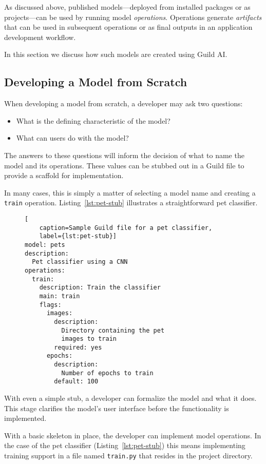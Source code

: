 \documentclass{article}
\begin{document}
As discussed above, published models---deployed from installed
packages or as projects---can be used by running model
\emph{operations}. Operations generate \emph{artifacts} that can be
used in subsequent operations or as final outputs in an application
development workflow.

In this section we discuss how such models are created using Guild AI.

\subsection{Developing a Model from Scratch}

When developing a model from scratch, a developer may ask two
questions:

\begin{itemize}
\item What is the defining characteristic of the model?
\item What can users do with the model?
\end{itemize}

The answers to these questions will inform the decision of what to
name the model and its operations. These values can be stubbed out in
a Guild file to provide a scaffold for implementation.

In many cases, this is simply a matter of selecting a model name and
creating a \verb|train| operation. Listing~\ref{lst:pet-stub}
illustrates a straightforward pet classifier.

\begin{figure}
\begin{lstlisting}[
    caption=Sample Guild file for a pet classifier,
    label={lst:pet-stub}]
model: pets
description:
  Pet classifier using a CNN
operations:
  train:
    description: Train the classifier
    main: train
    flags:
      images:
        description:
          Directory containing the pet
          images to train
        required: yes
      epochs:
        description:
          Number of epochs to train
        default: 100
\end{lstlisting}
\end{figure}

With even a simple stub, a developer can formalize the model and what
it does. This stage clarifies the model's user interface before the
functionality is implemented.

With a basic skeleton in place, the developer can implement model
operations. In the case of the pet classifier
(Listing~\ref{lst:pet-stub}) this means implementing training support
in a file named \verb|train.py| that resides in the project directory.
\end{document}

